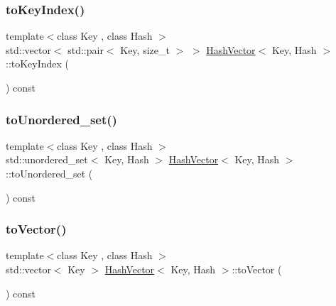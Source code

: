 \mbox{\label{class_hash_vector_a35579dfa738189e4d372f85621c48733}} 
\subsubsection{\texorpdfstring{to\+Key\+Index()}{toKeyIndex()}}
{\footnotesize\ttfamily template$<$class Key , class Hash $>$ \\
std\+::vector$<$ std\+::pair$<$ Key, size\+\_\+t $>$ $>$ \mbox{\hyperlink{class_hash_vector}{Hash\+Vector}}$<$ Key, Hash $>$\+::to\+Key\+Index (\begin{DoxyParamCaption}{ }\end{DoxyParamCaption}) const}

\mbox{\label{class_hash_vector_acdd566cb4429b25603131499168a0854}} 
\subsubsection{\texorpdfstring{to\+Unordered\+\_\+set()}{toUnordered\_set()}}
{\footnotesize\ttfamily template$<$class Key , class Hash $>$ \\
std\+::unordered\+\_\+set$<$ Key, Hash $>$ \mbox{\hyperlink{class_hash_vector}{Hash\+Vector}}$<$ Key, Hash $>$\+::to\+Unordered\+\_\+set (\begin{DoxyParamCaption}{ }\end{DoxyParamCaption}) const}

\mbox{\label{class_hash_vector_a37bd6de48acf712ae3936a6259c82899}} 
\subsubsection{\texorpdfstring{to\+Vector()}{toVector()}}
{\footnotesize\ttfamily template$<$class Key , class Hash $>$ \\
std\+::vector$<$ Key $>$ \mbox{\hyperlink{class_hash_vector}{Hash\+Vector}}$<$ Key, Hash $>$\+::to\+Vector (\begin{DoxyParamCaption}{ }\end{DoxyParamCaption}) const}



